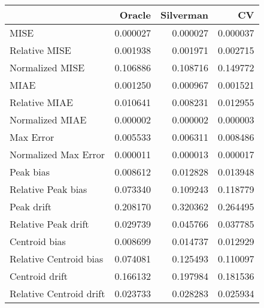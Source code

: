 \begin{tabular}{lrrr}
  \hline
 & Oracle & Silverman & CV \\ 
  \hline
MISE & 0.000027 & 0.000027 & 0.000037 \\ 
  Relative MISE & 0.001938 & 0.001971 & 0.002715 \\ 
  Normalized MISE & 0.106886 & 0.108716 & 0.149772 \\ 
  MIAE & 0.001250 & 0.000967 & 0.001521 \\ 
  Relative MIAE & 0.010641 & 0.008231 & 0.012955 \\ 
  Normalized MIAE & 0.000002 & 0.000002 & 0.000003 \\ 
  Max Error & 0.005533 & 0.006311 & 0.008486 \\ 
  Normalized Max Error & 0.000011 & 0.000013 & 0.000017 \\ 
  Peak bias & 0.008612 & 0.012828 & 0.013948 \\ 
  Relative Peak bias & 0.073340 & 0.109243 & 0.118779 \\ 
  Peak drift & 0.208170 & 0.320362 & 0.264495 \\ 
  Relative Peak drift & 0.029739 & 0.045766 & 0.037785 \\ 
  Centroid bias & 0.008699 & 0.014737 & 0.012929 \\ 
  Relative Centroid bias & 0.074081 & 0.125493 & 0.110097 \\ 
  Centroid drift & 0.166132 & 0.197984 & 0.181536 \\ 
  Relative Centroid drift & 0.023733 & 0.028283 & 0.025934 \\ 
   \hline
\end{tabular}
